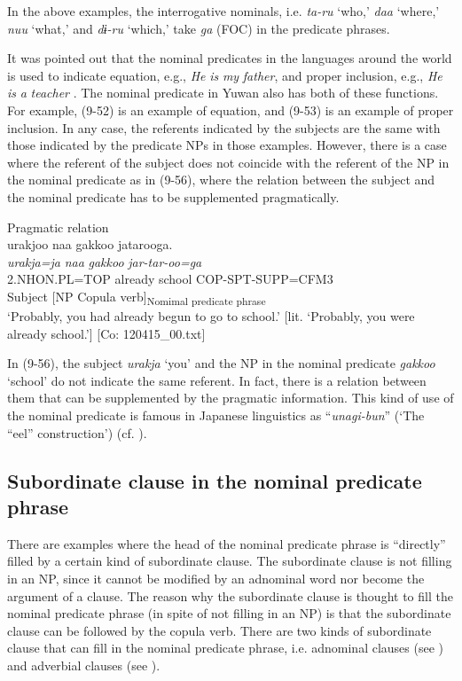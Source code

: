 In the above examples, the interrogative nominals, i.e. \textit{ta-ru} ‘who,’ \textit{daa} ‘where,’ \textit{nuu} ‘what,’ and \textit{dɨ-ru} ‘which,’ take \textit{ga} (FOC) in the predicate phrases.

It was pointed out that the nominal predicates in the languages around the world is used to indicate equation, e.g., \textit{He} \textit{is} \textit{my} \textit{father}, and proper inclusion, e.g., \textit{He} \textit{is} \textit{a} \textit{teacher} \citep[114]{Payne1997}. The nominal predicate in Yuwan also has both of these functions. For example, (9-52) is an example of equation, and (9-53) is an example of proper inclusion. In any case, the referents indicated by the subjects are the same with those indicated by the predicate NPs in those examples. However, there is a case where the referent of the subject does not coincide with the referent of the NP in the nominal predicate as in (9-56), where the relation between the subject and the nominal predicate has to be supplemented pragmatically.

\ea   Pragmatic relation \label{ex:9.56}\\
 \gllll  urakjoo  naa  gakkoo  jatarooga.\\
    \textit{urakja=ja}  \textit{naa}  \textit{gakkoo}  \textit{jar-tar-oo=ga}\\
    2.NHON.PL=TOP  already  school  COP-SPT-SUPP=CFM3\\
    Subject    [NP  Copula verb]\textsubscript{Nomimal predicate phrase}\\
    \glt     ‘Probably, you had already begun to go to school.’ [lit. ‘Probably, you were already school.’] [Co: 120415\_00.txt]
\z

In (9-56), the subject \textit{urakja} ‘you’ and the NP in the nominal predicate \textit{gakkoo} ‘school’ do not indicate the same referent. In fact, there is a relation between them that can be supplemented by the pragmatic information. This kind of use of the nominal predicate is famous in Japanese linguistics as “\textit{unagi-bun}” (‘The “eel” construction’) (cf. \citealt{Okutsu1978}).

\subsection{Subordinate clause in the nominal predicate phrase}\label{sec:9.3.2}

There are examples where the head of the nominal predicate phrase is “directly” filled by a certain kind of subordinate clause. The subordinate clause is not filling in an NP, since it cannot be modified by an adnominal word nor become the argument of a clause. The reason why the subordinate clause is thought to fill the nominal predicate phrase (in spite of not filling in an NP) is that the subordinate clause can be followed by the copula verb. There are two kinds of subordinate clause that can fill in the nominal predicate phrase, i.e. adnominal clauses (see ) and adverbial clauses (see ).

